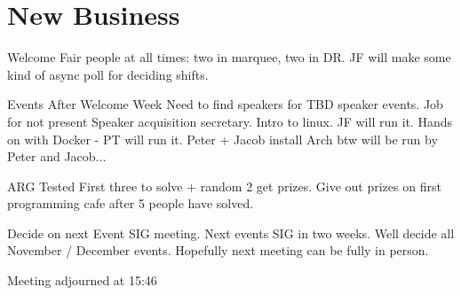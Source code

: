 \documentclass[11pt,hacksoc]{meetingmins}
\begin{document}
\section{New Business}
\begin{items}
  \item {Welcome Fair}
   people at all times: two in marquee, two in DR.
  \subitem JF will make some kind of async poll for deciding shifts.

  \item {Events After Welcome Week}
  \subitem Need to find speakers for TBD speaker events. Job for not present Speaker acquisition secretary.
  \subitem Intro to linux. JF will run it.
  \subitem Hands on with Docker - PT will run it.
  \subitem Peter + Jacob install Arch btw will be run by Peter and Jacob...

  \item {ARG Tested}
  \subitem First three to solve + random 2 get prizes. Give out prizes on first programming cafe after 5 people have solved.

  \item {Decide on next Event SIG meeting.}
  \subitem Next events SIG in two weeks.
  \subitem Well decide all November / December events.
  \subitem Hopefully next meeting can be fully in person.

  \item {Meeting adjourned at 15:46}

\end{items}



\vspace{1em}
\nextmeeting{}
\end{document}
